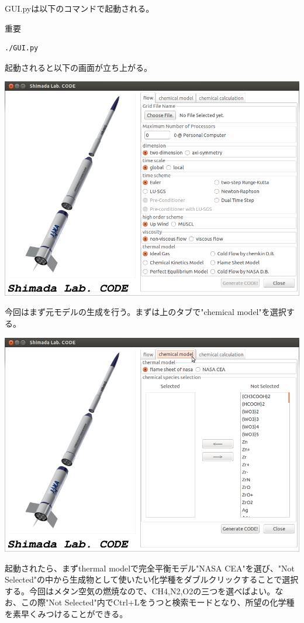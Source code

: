 \documentclass{jsarticle}
\begin{document}
GUI.pyは以下のコマンドで起動される。
\begin{itembox}[l]{重要}
\begin{verbatim}
./GUI.py
\end{verbatim}
\end{itembox}
起動されると以下の画面が立ち上がる。
\begin{center}
\includegraphics[width=.7\textwidth,bb=0 0 895 649]{tutorial_img/010.png}
\end{center}
今回はまず元モデルの生成を行う。まずは上のタブで"chemical model"を選択する。
\begin{center}
\includegraphics[width=.7\textwidth,bb=0 0 895 649]{tutorial_img/020.png}
\end{center}
起動されたら、まずthermal modelで完全平衡モデル"NASA CEA"を選び、"Not Selected"の中から生成物として使いたい化学種をダブルクリックすることで選択する。今回はメタン空気の燃焼なので、CH4,N2,O2の三つを選べばよい。なお、この際"Not Selected"内でCtrl+Lをうつと検索モードとなり、所望の化学種を素早くみつけることができる。
\end{document}
